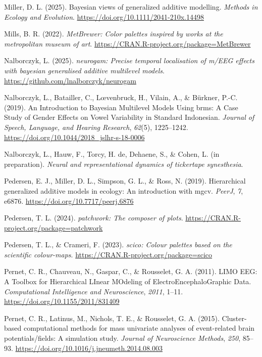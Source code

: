 \documentclass[
  doc,
  floatsintext,
  longtable,
  a4paper,
  nolmodern,
  notxfonts,
  notimes,
  colorlinks=true,linkcolor=blue,citecolor=blue,urlcolor=blue]{apa7}
\newlength{\cslhangindent}
\newenvironment{CSLReferences}[2] %
 {\begin{list}{}{%
  \setlength{\itemindent}{0pt}
  \setlength{\leftmargin}{0pt}
  \setlength{\parsep}{0pt}
  \ifodd #1
   \setlength{\leftmargin}{\cslhangindent}
   \setlength{\itemindent}{-1\cslhangindent}
  \fi
  \setlength{\itemsep}{#2\baselineskip}}}
 {\end{list}}
\begin{document}
\begin{CSLReferences}{1}{0}
Miller, D. L. (2025). Bayesian views of generalized additive modelling.
\emph{Methods in Ecology and Evolution}.
\url{https://doi.org/10.1111/2041-210x.14498}

Mills, B. R. (2022). \emph{{MetBrewer}: Color palettes inspired by works
at the metropolitan museum of art}.
\url{https://CRAN.R-project.org/package=MetBrewer}

Nalborczyk, L. (2025). \emph{{neurogam}: Precise temporal localisation
of m/EEG effects with bayesian generalised additive multilevel models}.
\url{https://github.com/lnalborczyk/neurogam}

Nalborczyk, L., Batailler, C., Lœvenbruck, H., Vilain, A., \& Bürkner,
P.-C. (2019). An Introduction to Bayesian Multilevel Models Using brms:
A Case Study of Gender Effects on Vowel Variability in Standard
Indonesian. \emph{Journal of Speech, Language, and Hearing Research},
\emph{62}(5), 1225--1242.
\url{https://doi.org/10.1044/2018_jslhr-s-18-0006}

Nalborczyk, L., Hauw, F., Torcy, H. de, Dehaene, S., \& Cohen, L. (in
preparation). \emph{Neural and representational dynamics of tickertape
synesthesia}.

Pedersen, E. J., Miller, D. L., Simpson, G. L., \& Ross, N. (2019).
Hierarchical generalized additive models in ecology: An introduction
with mgcv. \emph{PeerJ}, \emph{7}, e6876.
\url{https://doi.org/10.7717/peerj.6876}

Pedersen, T. L. (2024). \emph{{patchwork}: The composer of plots}.
\url{https://CRAN.R-project.org/package=patchwork}

Pedersen, T. L., \& Crameri, F. (2023). \emph{{scico}: Colour palettes
based on the scientific colour-maps}.
\url{https://CRAN.R-project.org/package=scico}

Pernet, C. R., Chauveau, N., Gaspar, C., \& Rousselet, G. A. (2011).
LIMO EEG: A Toolbox for Hierarchical LInear MOdeling of
ElectroEncephaloGraphic Data. \emph{Computational Intelligence and
Neuroscience}, \emph{2011}, 1--11.
\url{https://doi.org/10.1155/2011/831409}

Pernet, C. R., Latinus, M., Nichols, T. E., \& Rousselet, G. A. (2015).
Cluster-based computational methods for mass univariate analyses of
event-related brain potentials/fields: A simulation study. \emph{Journal
of Neuroscience Methods}, \emph{250}, 85--93.
\url{https://doi.org/10.1016/j.jneumeth.2014.08.003}


\end{CSLReferences}
\end{document}
